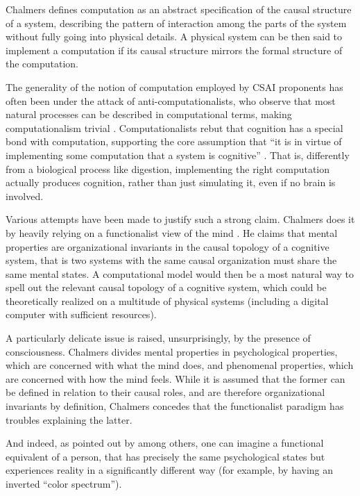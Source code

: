 \documentclass{article}
\begin{document}
Chalmers defines computation as an abstract specification of the causal structure of a system, describing the pattern of interaction among the parts of the system without fully going into physical details. A physical system can be then said to implement a computation if its causal structure mirrors the formal structure of the computation.

The generality of the notion of computation employed by CSAI proponents has often been under the attack of anti-computationalists, who observe that most natural processes can be described in computational terms, making computationalism trivial \citep{sep-computational-mind}. Computationalists rebut that cognition has a special bond with computation, supporting the core assumption that ``it is in virtue of implementing some computation that a system is cognitive'' \citep[2.2]{chalmers2011computational}. That is, differently from a biological process like digestion, implementing the right computation actually produces cognition, rather than just simulating it, even if no brain is involved.

Various attempts have been made to justify such a strong claim. Chalmers does it by heavily relying on a functionalist view of the mind \citep{sep-computational-mind}. He claims that mental properties are organizational invariants in the causal topology of a cognitive system, that is two systems with the same causal organization must share the same mental states. A computational model would then be a most natural way to spell out the relevant causal topology of a cognitive system, which could be theoretically realized on a multitude of physical systems (including a digital computer with sufficient resources).

A particularly delicate issue is raised, unsurprisingly, by the presence of consciousness. Chalmers divides mental properties in psychological properties, which are concerned with what the mind does, and phenomenal properties, which are concerned with how the mind feels. While it is assumed that the former can be defined in relation to their causal roles, and are therefore organizational invariants by definition, Chalmers concedes that the functionalist paradigm has troubles explaining the latter.

And indeed, as pointed out by \cite{block1980troubles} among others, one can imagine a functional equivalent of a person, that has precisely the same psychological states but experiences reality in a significantly different way (for example, by having an inverted ``color spectrum'').
\end{document}
